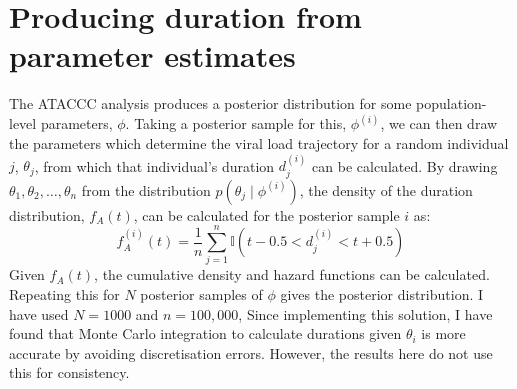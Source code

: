\documentclass[thesis.tex]{subfiles}
\begin{document}
\section{Producing duration from parameter estimates}

The ATACCC analysis produces a posterior distribution for some population-level parameters, $\phi$.
Taking a posterior sample for this, $\phi^{(i)}$, we can then draw the parameters which determine the viral
load trajectory for a random individual $j$, $\theta_j$, from which that individual's duration $d_j^{(i)}$ can be calculated.
By drawing $\theta_1, \theta_2, \dots, \theta_n$ from the distribution $p(\theta_j \mid\phi^{(i)})$, the density of the duration distribution, $f_A(t)$, can be
calculated for the posterior sample $i$ as:
$$
f^{(i)}_A(t) = \frac{1}{n}\sum_{j=1}^n \mathbb{I} \left( t-0.5 < d_j^{(i)} < t+0.5 \right)
$$
Given $f_A(t)$, the cumulative density and hazard functions can be calculated.
Repeating this for $N$ posterior samples of $\phi$ gives the posterior distribution.
I have used $N = 1000$ and $n = 100,000$, 
Since implementing this solution, I have found that Monte Carlo integration to calculate durations given $\theta_i$ is more accurate by avoiding discretisation errors.
However, the results here do not use this for consistency.
\end{document}
